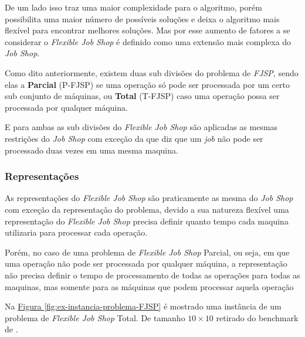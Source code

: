             De um lado isso traz uma maior complexidade para o algoritmo, porém possibilita uma maior número de possíveis soluções e deixa o algoritmo mais flexível para encontrar melhores soluções. Mas por esse aumento de fatores a se considerar o \textit{Flexible Job Shop} é definido como uma extensão mais complexa do \textit{Job Shop}.\hfill\vspace{\onelineskip}

            Como dito anteriormente, existem duas sub divisões do problema de \textit{FJSP}, sendo elas a \textbf{Parcial} (P-FJSP) se uma operação só pode ser processada por um certo sub conjunto de máquinas, ou \textbf{Total} (T-FJSP) caso uma operação possa ser processada por qualquer máquina.\hfill\vspace{\onelineskip}

            E para ambas as sub divisões do \textit{Flexible Job Shop} são aplicadas as mesmas restrições do \textit{Job Shop} com exceção da que diz que um \textit{job} não pode ser processado duas vezes em uma mesma maquina.\hfill

        \subsubsection{Representações}
            As representações do \textit{Flexible Job Shop} são praticamente as mesma do \textit{Job Shop} com exceção da representação do problema, devido a sua natureza flexível uma representação do \textit{Flexible Job Shop} precisa definir quanto tempo cada maquina utilizaria para processar cada operação.\breakline
            
            Porém, no caso de uma problema de \textit{Flexible Job Shop} Parcial, ou seja, em que uma operação não pode ser processada por qualquer máquina, a representação não precisa definir o tempo de processamento de todas as operações para todas as maquinas, mas somente para as máquinas que podem processar aquela operação


            Na 
            \hyperref[fig:ex-instancia-problema-FJSP]{Figura \ref{fig:ex-instancia-problema-FJSP}} 
            é mostrado uma instância de um problema de \textit{Flexible Job Shop} Total. De tamanho $10\times10$ retirado do benchmark de \cite{Kacem2002}.\breakline
            
